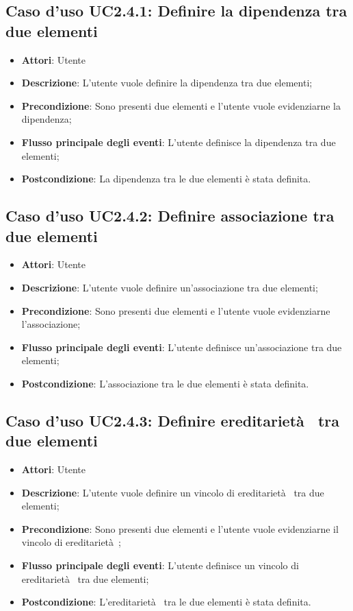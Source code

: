 \documentclass[../AnalisiDeiRequisiti.tex]{subfiles}
\begin{document}
		\subsection{Caso d'uso UC2.4.1: Definire la dipendenza tra due elementi}
		\begin{itemize}
			\item \textbf{Attori}: Utente
			\item \textbf{Descrizione}: L'utente vuole definire la dipendenza tra due elementi;
			\item \textbf{Precondizione}: Sono presenti due elementi e l'utente vuole evidenziarne la dipendenza;
			\item \textbf{Flusso principale degli eventi}: L'utente definisce la dipendenza tra due elementi;
			\item \textbf{Postcondizione}: La dipendenza tra le due elementi è stata definita.
		\end{itemize}
		\subsection{Caso d'uso UC2.4.2: Definire associazione tra due elementi}
		\begin{itemize}
			\item \textbf{Attori}: Utente
			\item \textbf{Descrizione}: L'utente vuole definire un'associazione tra due elementi;
			\item \textbf{Precondizione}: Sono presenti due elementi e l'utente vuole evidenziarne l'associazione;
			\item \textbf{Flusso principale degli eventi}: L'utente definisce un'associazione tra due elementi;
			\item \textbf{Postcondizione}: L'associazione tra le due elementi è stata definita.
		\end{itemize}
		\subsection{Caso d'uso UC2.4.3: Definire ereditarietà  tra due elementi}
		\begin{itemize}
			\item \textbf{Attori}: Utente
			\item \textbf{Descrizione}: L'utente vuole definire un vincolo di ereditarietà  tra due elementi;
			\item \textbf{Precondizione}: Sono presenti due elementi e l'utente vuole evidenziarne il vincolo di ereditarietà ;
			\item \textbf{Flusso principale degli eventi}: L'utente definisce un vincolo di ereditarietà  tra due elementi;
			\item \textbf{Postcondizione}: L'ereditarietà  tra le due elementi è stata definita.
		\end{itemize}
\end{document}
